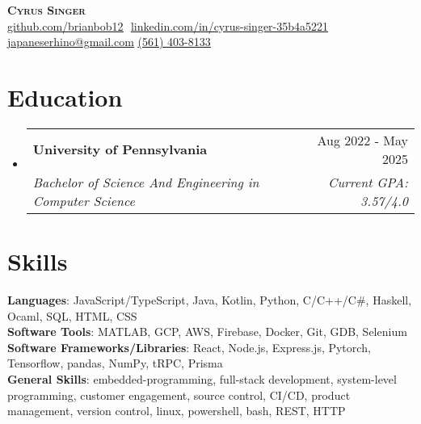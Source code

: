\documentclass[letterpaper,11pt]{article}
\makeatletter
\newcommand{\resumeSubheading}[4]{
  \vspace{-2pt}\item
    \begin{tabular*}{0.97\textwidth}[t]{l@{\extracolsep{\fill}}r}
      \textbf{#1} & #2 \\
      \textit{\small#3} & \textit{\small #4} \\
    \end{tabular*}\vspace{-7pt}
}
\newcommand{\resumeSubHeadingListStart}{\begin{itemize}[leftmargin=0.15in, label={}]}
\newcommand{\resumeSubHeadingListEnd}{\end{itemize}}
\makeatother
\begin{document}
\hfill

\begin{center}
    \textbf{\Huge \scshape Cyrus Singer} \\ \vspace{8pt}
    \small 
    \href{https://github.com/brianbob12}{\underline{github.com/brianbob12}} $  $
    \href{https://www.linkedin.com/in/cyrus-singer-35b4a5221}{\underline{linkedin.com/in/cyrus-singer-35b4a5221}} $  $
    \href{mailto:japaneserhino@gmail.com}
    {\underline{japaneserhino@gmail.com}}
    \href{tel:561-403-8133}{\underline{(561) 403-8133}}
\end{center}

\section{Education}
  \resumeSubHeadingListStart
  
    \resumeSubheading
      {University of Pennsylvania}{Aug 2022 - May 2025}
      {Bachelor of Science And Engineering in Computer Science}{Current GPA: 3.57/4.0}
      \vspace{3pt}

      
      
  \resumeSubHeadingListEnd

  \section{Skills}
  \begin{itemize}[leftmargin=0.15in, label={}]
      \small{\item{
      
      \textbf{Languages}{: JavaScript/TypeScript, Java, Kotlin, Python, C/C++/C\#, Haskell, Ocaml, SQL, HTML, CSS} \\
      
      \textbf{Software Tools}{: MATLAB, GCP, AWS, Firebase, Docker, Git, GDB, Selenium}\\

      \textbf{Software Frameworks/Libraries}{: React, Node.js, Express.js, Pytorch, Tensorflow, pandas, NumPy, tRPC, Prisma} \\

      \textbf{General Skills}{: embedded-programming, full-stack development, system-level programming, customer engagement, source control, CI/CD, product management, version control, linux, powershell, bash, REST, HTTP}
      }}
  \end{itemize}
\end{document}
